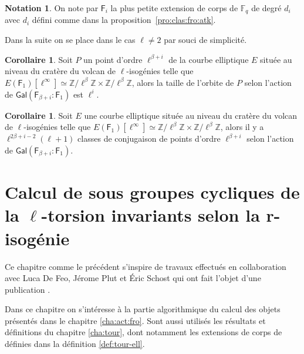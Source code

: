 \documentclass[10pt,a4paper]{book}
\theoremstyle{plain}
\theoremstyle{definition}
\theoremstyle{definition}
\newtheorem{cor}[thm]{Corollaire}
\theoremstyle{definition}
\theoremstyle{definition}
\theoremstyle{remark}
\theoremstyle{remark}
\theoremstyle{definition}
\newtheorem{nota}[thm]{Notation}
\begin{document}
\begin{nota}
On note par $\mathsf{F}_i$ la plus petite extension de corps de 
$\mathbb{F}_q$ de degré $d_i$ avec $d_i$ défini comme dans la 
proposition~\ref{pro:clas:fro:atk}.
\end{nota}

Dans la suite on se place dans le cas $\ell \neq 2$ par souci de simplicité.

\begin{cor}
Soit $P$ un point d'ordre $\ell^{\beta+i}$ de la courbe elliptique $E$ située 
au niveau du cratère du volcan de $\ell$-isogénies telle que $E(\mathsf{F}_
{1})[\ell^{\infty}] \simeq \mathbb{Z}/ \ell^{\beta} \mathbb{Z} \times 
\mathbb{Z}/ \ell^{\beta}\mathbb{Z}$, alors la taille de l'orbite de $P$ selon 
l'action de $\mathsf{Gal}(\mathsf{F}_{\beta+i}:\mathsf{F}_{1})$ est 
$\ell^i$. 
\end{cor}

\begin{cor}
Soit $E$ une courbe elliptique située au niveau du cratère du volcan de 
$\ell$-isogénies telle que $E(\mathsf{F}_1)[\ell^{\infty}] \simeq 
\mathbb{Z}/ \ell^{\beta} \mathbb{Z} \times \mathbb{Z}/ \ell^{\beta}\mathbb{Z}$,
alors il y a $\ell^{2\beta + i -2}(\ell+1)$ classes de conjugaison de points 
d'ordre $\ell^{\beta+i}$ selon l'action de $\mathsf{Gal}(
\mathsf{F}_{\beta+i}:\mathsf{F}_{1})$.
\end{cor}

\chapter{Calcul de sous groupes cycliques de la $\ell$-torsion invariants selon la r-isogénie}
\label{cha:con:poi}
Ce chapitre comme le précédent s'inspire de travaux effectués en collaboration avec Luca De Feo, J\'erome Plut et \'Eric Schost qui ont fait l'objet d'une publication \cite{Defeo_Plut_Schost_2016}.

Dans ce chapitre on s'intéresse à la partie algorithmique du calcul des objets présentés dans le chapitre \ref{cha:act:fro}. Sont aussi utilisés les résultats et définitions du chapitre \ref{cha:tour}, dont notamment les extensions de corps de définies dans la définition \ref{def:tour-ell}.
\end{document}
